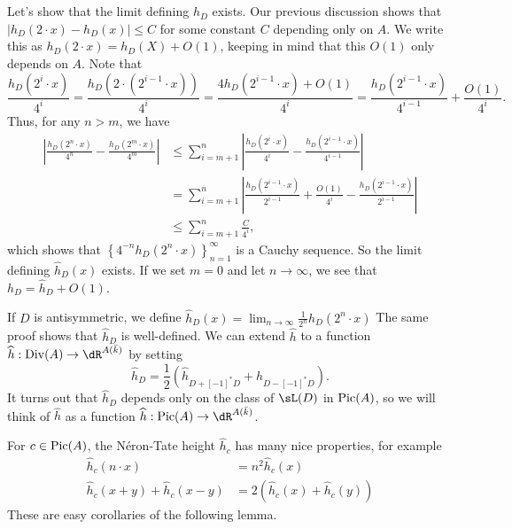 \documentclass{article}
\begin{document}
Let's show that the limit defining $\widehat h_D$ exists. Our previous 
discussion shows that $|h_D(2\cdot x)-h_D(x)|\leqslant C$ for some constant $C$ 
depending only on $A$. We write this as $h_D(2\cdot x)=h_D(X)+O(1)$, keeping in 
mind that this $O(1)$ only depends on $A$. Note that 
\[
  \frac{h_D(2^i\cdot x)}{4^i} = \frac{h_D(2\cdot (2^{i-1}\cdot x))}{4^i} = \frac{4 h_D(2^{i-1}\cdot x)+O(1)}{4^i} = \frac{h_D(2^{i-1}\cdot x)}{4^{i-1}} + \frac{O(1)}{4^i} \text{.}
\]
Thus, for any $n>m$, we have 
\begin{align*}
  \left| \frac{h_D(2^n \cdot x)}{4^n} - \frac{h_D(2^m\cdot x)}{4^m}\right|
    &\leqslant \sum_{i=m+1}^n \left|\frac{h_D(2^i\cdot x)}{4^i} - \frac{h_D(2^{i-1}\cdot x)}{4^{i-1}}\right| \\
    &= \sum_{i=m+1}^n \left|\frac{h_D(2^{i-1}\cdot x)}{2^{i-1}} +\frac{O(1)}{4^i} - \frac{h_D(2^{i-1}\cdot x)}{2^{i-1}}\right| \\
    &\leqslant \sum_{i=m+1}^n \frac{C}{4^i} \text{,}
\end{align*}
which shows that $\left\{4^{-n} h_D(2^n\cdot x)\right\}_{n=1}^\infty$ is a Cauchy 
sequence. So the limit defining $\widehat h_D(x)$ exists. If we set $m=0$ and 
let $n\to \infty$, we see that $h_D=\widehat h_D+O(1)$. 

If $D$ is antisymmetric, we define 
$\widehat h_D(x)=\lim_{n\to\infty} \frac{1}{2^n} h_D(2^n\cdot x)$
The same proof shows that $\widehat h_D$ is well-defined. We can extend 
$\widehat h$ to a function $\widehat h:\divisor(A)\to \dR^{A(\bar k)}$ by setting 
\[
  \widehat h_D=\frac 1 2 \left(\widehat h_{D+[-1]^\ast D} +  h_{D-[-1]^\ast D}\right) \text{.}
\]
It turns out that $\widehat h_D$ depends only on the class of $\sL(D)$ in 
$\operatorname{Pic}(A)$, so we will think of $\widehat h$ as a function 
$\widehat h:\picard(A) \to \dR^{A(\bar k)}$. 

For $c\in \operatorname{Pic}(A)$, the N\'eron-Tate height $\widehat h_c$ has many nice 
properties, for example 
\begin{align*}
  \widehat h_c(n\cdot x) &= n^2 \widehat h_c(x) \\
  \widehat h_c(x+y)+\widehat h_c(x-y) &= 2\left(\widehat h_c(x)+\widehat h_c(y)\right)
\end{align*}
These are easy corollaries of the following lemma.
\end{document}
